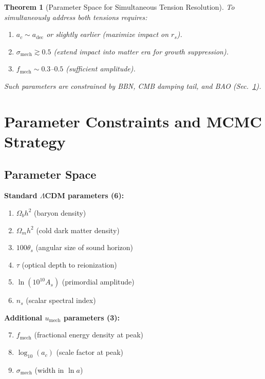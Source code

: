 \documentclass[11pt,a4paper]{article}
\newcommand{\umech}{\ensuremath{u_{\mathrm{mech}}}}
\newcommand{\fmech}{\ensuremath{f_{\mathrm{mech}}}}
\newcommand{\ac}{\ensuremath{a_c}}
\newcommand{\sigmamech}{\ensuremath{\sigma_{\mathrm{mech}}}}
\newcommand{\adec}{\ensuremath{a_{\mathrm{dec}}}}
\newcommand{\rs}{\ensuremath{r_s}}
\newcommand{\Omm}{\ensuremath{\Omega_m}}
\newcommand{\Omb}{\ensuremath{\Omega_b}}
\newtheorem{theorem}{Theorem}[section]
\theoremstyle{definition}
\theoremstyle{remark}
\begin{document}
\begin{theorem}[Parameter Space for Simultaneous Tension Resolution]
\label{thm:parameter_space}
To simultaneously address both tensions requires:
\begin{enumerate}[leftmargin=*, itemsep=0.2em]
\item $\ac \sim \adec$ or slightly earlier (maximize impact on $\rs$).
\item $\sigmamech \gtrsim 0.5$ (extend impact into matter era for growth suppression).
\item $\fmech \sim 0.3$--$0.5$ (sufficient amplitude).
\end{enumerate}
Such parameters are constrained by BBN, CMB damping tail, and BAO (Sec.~\ref{sec:parameter_constraints}).
\end{theorem}

\section{Parameter Constraints and MCMC Strategy}
\label{sec:parameter_constraints}

\subsection{Parameter Space}
\label{sec:parameter_space}

\textbf{Standard $\Lambda$CDM parameters (6):}
\begin{enumerate}[leftmargin=*, itemsep=0.2em]
\item $\Omb h^2$ (baryon density)
\item $\Omm h^2$ (cold dark matter density)
\item $100\theta_s$ (angular size of sound horizon)
\item $\tau$ (optical depth to reionization)
\item $\ln(10^{10} A_s)$ (primordial amplitude)
\item $n_s$ (scalar spectral index)
\end{enumerate}

\textbf{Additional $\umech$ parameters (3):}
\begin{enumerate}[leftmargin=*, itemsep=0.2em]
\setcounter{enumi}{6}
\item $\fmech$ (fractional energy density at peak)
\item $\log_{10}(\ac)$ (scale factor at peak)
\item $\sigmamech$ (width in $\ln a$)
\end{enumerate}
\end{document}
